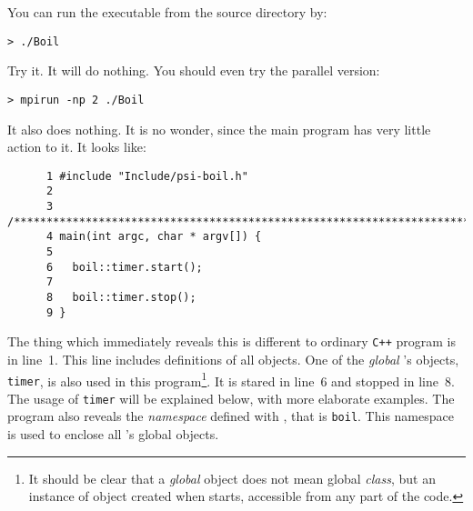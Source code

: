 You can run the executable from the source directory by:
%
\begin{verbatim}
> ./Boil
\end{verbatim} 
%
Try it. It will do nothing. You should even try the parallel version:
%
\begin{verbatim}
> mpirun -np 2 ./Boil
\end{verbatim} 
%
It also does nothing. It is no wonder, since the main program has very little action
to it. It looks like:
%
{\small \begin{verbatim}
      1 #include "Include/psi-boil.h"
      2
      3 /****************************************************************************/
      4 main(int argc, char * argv[]) {
      5
      6   boil::timer.start();
      7
      8   boil::timer.stop();
      9 }
\end{verbatim}} 
%
The thing which immediately reveals this is different to ordinary {\tt C++} program 
is in line~1. This line includes definitions of all {\psiboil} objects. One of the
{\em global} {\psiboil}'s objects, {\tt timer}, is also used in this program\footnote
{It should be clear that a {\em global} {\psiboil} object does not mean global 
{\em class}, but an instance of object created when {\psiboil} starts, accessible 
from any part of the code.}.
It is stared in line~6 and stopped in line~8. The usage of {\tt timer} will be explained
below, with more elaborate examples. The program also reveals the {\em namespace}
defined with {\psiboil}, that is {\tt boil}. This namespace is used to enclose
all {\psiboil}'s global objects. 



